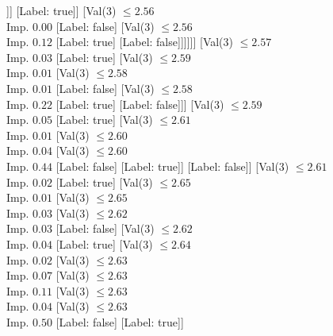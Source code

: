 \documentclass[margin=10pt]{standalone}
\begin{document}
\begin{forest}
													[Val($3$) $ \leq 2.54$ \\ Imp. $0.02$
														[Label: false]
														[Val($3$) $ \leq 2.54$ \\ Imp. $0.32$
															[Label: true]
															[Label: false]]]
													[Label: true]]
												[Val($3$) $ \leq 2.56$ \\ Imp. $0.00$
													[Label: false]
													[Val($3$) $ \leq 2.56$ \\ Imp. $0.12$
														[Label: true]
														[Label: false]]]]]]
									[Val($3$) $ \leq 2.57$ \\ Imp. $0.03$
										[Label: true]
										[Val($3$) $ \leq 2.59$ \\ Imp. $0.01$
											[Val($3$) $ \leq 2.58$ \\ Imp. $0.01$
												[Label: false]
												[Val($3$) $ \leq 2.58$ \\ Imp. $0.22$
													[Label: true]
													[Label: false]]]
											[Val($3$) $ \leq 2.59$ \\ Imp. $0.05$
												[Label: true]
												[Val($3$) $ \leq 2.61$ \\ Imp. $0.01$
													[Val($3$) $ \leq 2.60$ \\ Imp. $0.04$
														[Val($3$) $ \leq 2.60$ \\ Imp. $0.44$
															[Label: false]
															[Label: true]]
														[Label: false]]
													[Val($3$) $ \leq 2.61$ \\ Imp. $0.02$
														[Label: true]
														[Val($3$) $ \leq 2.65$ \\ Imp. $0.01$
															[Val($3$) $ \leq 2.65$ \\ Imp. $0.03$
																[Val($3$) $ \leq 2.62$ \\ Imp. $0.03$
																	[Label: false]
																	[Val($3$) $ \leq 2.62$ \\ Imp. $0.04$
																		[Label: true]
																		[Val($3$) $ \leq 2.64$ \\ Imp. $0.02$
																			[Val($3$) $ \leq 2.63$ \\ Imp. $0.07$
																				[Val($3$) $ \leq 2.63$ \\ Imp. $0.11$
																					[Val($3$) $ \leq 2.63$ \\ Imp. $0.04$
																						[Val($3$) $ \leq 2.63$ \\ Imp. $0.50$
																							[Label: false]
																							[Label: true]]

\end{forest}
\end{document}
